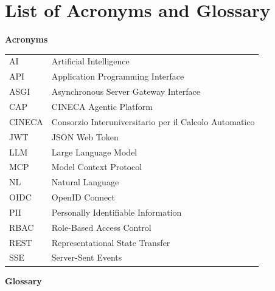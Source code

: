 \documentclass[a4paper]{sapthesis}
\begin{document}


{\let\cleardoublepage\clearpage\tableofcontents}



\chapter*{List of Acronyms and Glossary}

\vspace{0.5cm}
\noindent\textbf{\large Acronyms}
\vspace{0.3cm}

\noindent\begin{tabularx}{\textwidth}{@{}l X@{}}
AI     & Artificial Intelligence \\
API    & Application Programming Interface \\
ASGI   & Asynchronous Server Gateway Interface \\
CAP    & CINECA Agentic Platform \\
CINECA & Consorzio Interuniversitario per il Calcolo Automatico \\
JWT    & JSON Web Token \\
LLM    & Large Language Model \\
MCP    & Model Context Protocol \\
NL     & Natural Language \\
OIDC   & OpenID Connect \\
PII    & Personally Identifiable Information \\
RBAC   & Role-Based Access Control \\
REST   & Representational State Transfer \\
SSE    & Server-Sent Events \\
\end{tabularx}

\vspace{0.8cm}
\noindent\textbf{\large Glossary}
\vspace{0.3cm}
\end{document}
